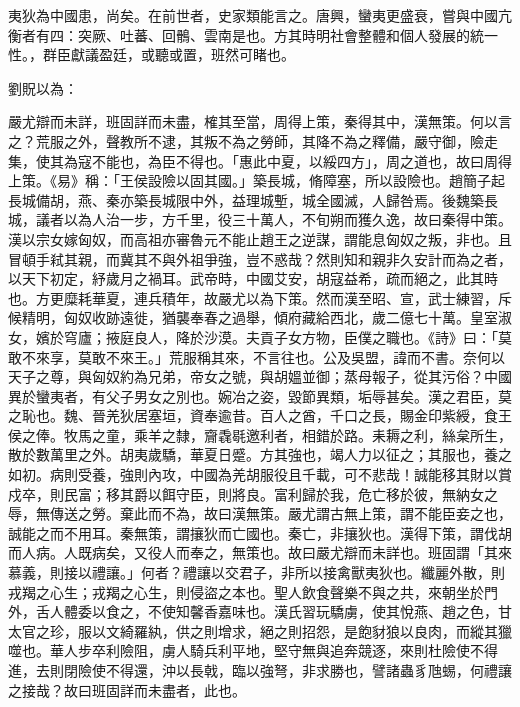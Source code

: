 
\begin{pinyinscope}

 夷狄為中國患，尚矣。在前世者，史家類能言之。唐興，蠻夷更盛衰，嘗與中國亢衡者有四：突厥、吐蕃、回鶻、雲南是也。方其時明社會整體和個人發展的統一性。，群臣獻議盈廷，或聽或置，班然可睹也。



 劉貺以為：



 嚴尤辯而未詳，班固詳而未盡，榷其至當，周得上策，秦得其中，漢無策。何以言之？荒服之外，聲教所不逮，其叛不為之勞師，其降不為之釋備，嚴守御，險走集，使其為寇不能也，為臣不得也。「惠此中夏，以綏四方」，周之道也，故曰周得上策。《易》稱：「王侯設險以固其國。」築長城，脩障塞，所以設險也。趙簡子起長城備胡，燕、秦亦築長城限中外，益理城塹，城全國滅，人歸咎焉。後魏築長城，議者以為人治一步，方千里，役三十萬人，不旬朔而獲久逸，故曰秦得中策。漢以宗女嫁匈奴，而高祖亦審魯元不能止趙王之逆謀，謂能息匈奴之叛，非也。且冒頓手弒其親，而冀其不與外祖爭強，豈不惑哉？然則知和親非久安計而為之者，以天下初定，紓歲月之禍耳。武帝時，中國艾安，胡寇益希，疏而絕之，此其時也。方更糜耗華夏，連兵積年，故嚴尤以為下策。然而漢至昭、宣，武士練習，斥候精明，匈奴收跡遠徙，猶襲奉春之過舉，傾府藏給西北，歲二億七十萬。皇室淑女，嬪於穹廬；掖庭良人，降於沙漠。夫貢子女方物，臣僕之職也。《詩》曰：「莫敢不來享，莫敢不來王。」荒服稱其來，不言往也。公及吳盟，諱而不書。奈何以天子之尊，與匈奴約為兄弟，帝女之號，與胡媼並御；蒸母報子，從其污俗？中國異於蠻夷者，有父子男女之別也。婉冶之姿，毀節異類，垢辱甚矣。漢之君臣，莫之恥也。魏、晉羌狄居塞垣，資奉逾昔。百人之酋，千口之長，賜金印紫綬，食王侯之俸。牧馬之童，乘羊之隸，齎毳毼邀利者，相錯於路。耒耨之利，絲枲所生，散於數萬里之外。胡夷歲驕，華夏日蹙。方其強也，竭人力以征之；其服也，養之如初。病則受養，強則內攻，中國為羌胡服役且千載，可不悲哉！誠能移其財以賞戍卒，則民富；移其爵以餌守臣，則將良。富利歸於我，危亡移於彼，無納女之辱，無傳送之勞。棄此而不為，故曰漢無策。嚴尤謂古無上策，謂不能臣妾之也，誠能之而不用耳。秦無策，謂攘狄而亡國也。秦亡，非攘狄也。漢得下策，謂伐胡而人病。人既病矣，又役人而奉之，無策也。故曰嚴尤辯而未詳也。班固謂「其來慕義，則接以禮讓。」何者？禮讓以交君子，非所以接禽獸夷狄也。纖麗外散，則戎羯之心生；戎羯之心生，則侵盜之本也。聖人飲食聲樂不與之共，來朝坐於門外，舌人體委以食之，不使知馨香嘉味也。漢氏習玩驕虜，使其悅燕、趙之色，甘太官之珍，服以文綺羅紈，供之則增求，絕之則招怨，是飽豺狼以良肉，而縱其獵噬也。華人步卒利險阻，虜人騎兵利平地，堅守無與追奔競逐，來則杜險使不得進，去則閉險使不得還，沖以長戟，臨以強弩，非求勝也，譬諸蟲豸虺蜴，何禮讓之接哉？故曰班固詳而未盡者，此也。




\end{pinyinscope}
